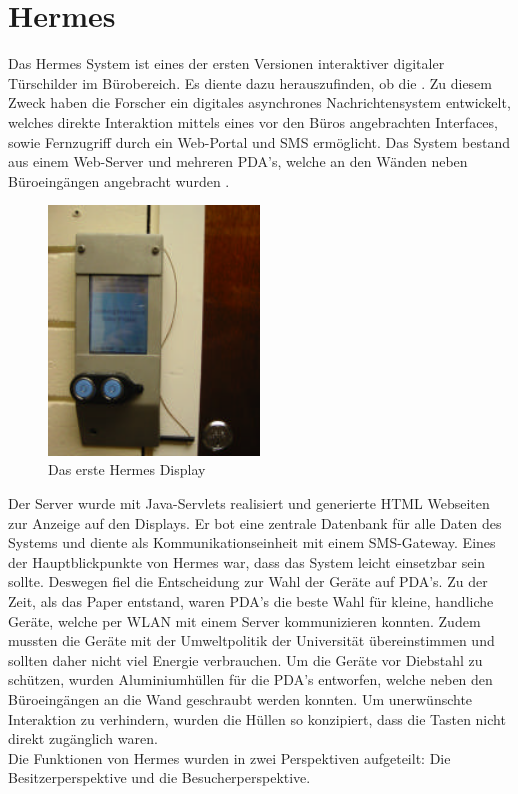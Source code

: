 \section{Hermes}
Das Hermes System \cite{cheverest:2003:paper,cheverest:2003:article,cheverest:2003:hermes,cheveres:2005:hermes-bluetooth} ist eines der ersten Versionen interaktiver digitaler Türschilder im Bürobereich.
Es diente dazu herauszufinden, ob die .
Zu diesem Zweck haben die Forscher ein digitales asynchrones Nachrichtensystem entwickelt, welches direkte Interaktion mittels eines vor den Büros angebrachten Interfaces, sowie Fernzugriff durch ein Web-Portal und SMS ermöglicht.
Das System bestand aus einem Web-Server und mehreren PDA's, welche an den Wänden neben Büroeingängen angebracht wurden .
\begin{figure}[h!]
  \centering
  \includegraphics[width=0.5\textwidth]{./img/hermes_display.png}
  \caption{Das erste Hermes Display \cite{cheverest:2003:paper}}
  \label{img:hermesDisplay}
\end{figure}
Der Server wurde mit Java-Servlets realisiert und generierte HTML Webseiten zur Anzeige auf den Displays. Er bot eine zentrale Datenbank für alle Daten des Systems und diente als Kommunikationseinheit mit einem SMS-Gateway.
Eines der Hauptblickpunkte von Hermes war, dass das System leicht einsetzbar sein sollte. Deswegen fiel die Entscheidung zur Wahl der Geräte auf PDA's. Zu der Zeit, als das Paper entstand, waren PDA's die beste Wahl für kleine, handliche Geräte, welche per WLAN mit einem Server kommunizieren konnten. Zudem mussten die Geräte mit der Umweltpolitik der Universität übereinstimmen und sollten daher nicht viel Energie verbrauchen.
Um die Geräte vor Diebstahl zu schützen, wurden Aluminiumhüllen für die PDA's entworfen, welche neben den Büroeingängen an die Wand geschraubt werden konnten. Um unerwünschte Interaktion zu verhindern, wurden die Hüllen so konzipiert, dass die Tasten nicht direkt zugänglich waren.
\\
Die Funktionen von Hermes wurden in zwei Perspektiven aufgeteilt: Die Besitzerperspektive und die Besucherperspektive.
